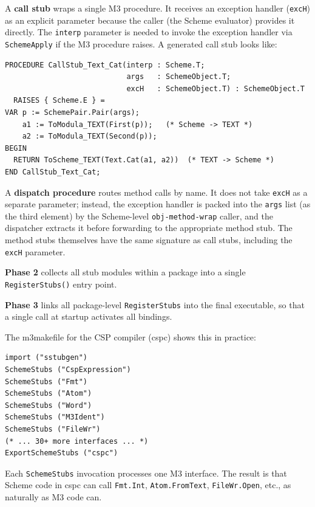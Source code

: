 \documentclass[
  12pt,
]{report}
\newcommand{\passthrough}[1]{#1}
\begin{document}
A \textbf{call stub} wraps a single M3 procedure. It receives an
exception handler (\passthrough{\lstinline!excH!}) as an explicit
parameter because the caller (the Scheme evaluator) provides it
directly. The \passthrough{\lstinline!interp!} parameter is needed to
invoke the exception handler via \passthrough{\lstinline!SchemeApply!}
if the M3 procedure raises. A generated call stub looks like:

\begin{lstlisting}
PROCEDURE CallStub_Text_Cat(interp : Scheme.T;
                            args   : SchemeObject.T;
                            excH   : SchemeObject.T) : SchemeObject.T
  RAISES { Scheme.E } =
VAR p := SchemePair.Pair(args);
    a1 := ToModula_TEXT(First(p));   (* Scheme -> TEXT *)
    a2 := ToModula_TEXT(Second(p));
BEGIN
  RETURN ToScheme_TEXT(Text.Cat(a1, a2))  (* TEXT -> Scheme *)
END CallStub_Text_Cat;
\end{lstlisting}

A \textbf{dispatch procedure} routes method calls by name. It does not
take \passthrough{\lstinline!excH!} as a separate parameter; instead,
the exception handler is packed into the \passthrough{\lstinline!args!}
list (as the third element) by the Scheme-level
\passthrough{\lstinline!obj-method-wrap!} caller, and the dispatcher
extracts it before forwarding to the appropriate method stub. The method
stubs themselves have the same signature as call stubs, including the
\passthrough{\lstinline!excH!} parameter.

\textbf{Phase 2} collects all stub modules within a package into a
single \passthrough{\lstinline!RegisterStubs()!} entry point.

\textbf{Phase 3} links all package-level
\passthrough{\lstinline!RegisterStubs!} into the final executable, so
that a single call at startup activates all bindings.

The m3makefile for the CSP compiler (cspc) shows this in practice:

\begin{lstlisting}
import ("sstubgen")
SchemeStubs ("CspExpression")
SchemeStubs ("Fmt")
SchemeStubs ("Atom")
SchemeStubs ("Word")
SchemeStubs ("M3Ident")
SchemeStubs ("FileWr")
(* ... 30+ more interfaces ... *)
ExportSchemeStubs ("cspc")
\end{lstlisting}

Each \passthrough{\lstinline!SchemeStubs!} invocation processes one M3
interface. The result is that Scheme code in cspc can call
\passthrough{\lstinline!Fmt.Int!},
\passthrough{\lstinline!Atom.FromText!},
\passthrough{\lstinline!FileWr.Open!}, etc., as naturally as M3 code
can.
\end{document}
